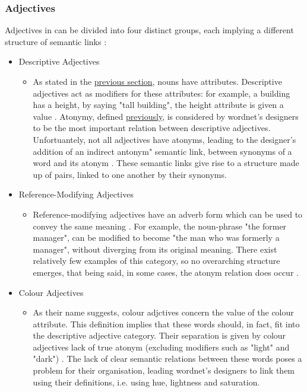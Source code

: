 \documentclass[]{article}
\begin{document}
\subsubsection{Adjectives}
\label{Adjectives}
Adjectives in can be divided into four distinct groups, each implying a different structure of semantic links \cite{WN3Adjectives}:
\begin{itemize}
	\item Descriptive Adjectives
	\begin{itemize}
		\item As stated in the \hyperref[Nouns]{previous section}, nouns have attributes. Descriptive adjectives act as modifiers for these attributes: for example, a building has a height, by saying "tall building", the height attribute is given a value \cite{WN3Adjectives}. Atonymy, defined \hyperref[Atonym]{previously}, is considered by wordnet's designers to be the most important relation between descriptive adjectives. Unfortuantely, not all adjectives have atonyms, leading to the designer's addition of an indirect antonym" semantic link, between synonyms of a word and its atonym \cite{WN3Adjectives}. These semantic links give rise to a structure made up of pairs, linked to one another by their synonyms.
	\end{itemize}		
		
	\item Reference-Modifying Adjectives
	\begin{itemize}
		\item Reference-modifying adjectives have an adverb form which can be used to convey the same meaning \cite{WN3Adjectives}. For example, the noun-phrase "the former manager", can be modified to become "the man who was formerly a manager", without diverging from its original meaning. There exist relatively few examples of this category, so no overarching structure emerges, that being said, in some cases, the atonym relation does occur \cite{WN3Adjectives}.
	\end{itemize}
	
	\item Colour Adjectives
	\begin{itemize}
		\item As their name suggests, colour adjctives concern the value of the colour attribute. This definition implies that these words should, in fact, fit into the descriptive adjective category. Their separation is given by colour adjectives lack of true atonym (excluding modifiers such as "light" and "dark") \cite{WN3Adjectives}. The lack of clear semantic relations between these words poses a problem for their organisation, leading wordnet's designers to link them using their definitions, i.e. using hue, lightness and saturation.
	\end{itemize}	
	

\end{itemize}
\end{document}
